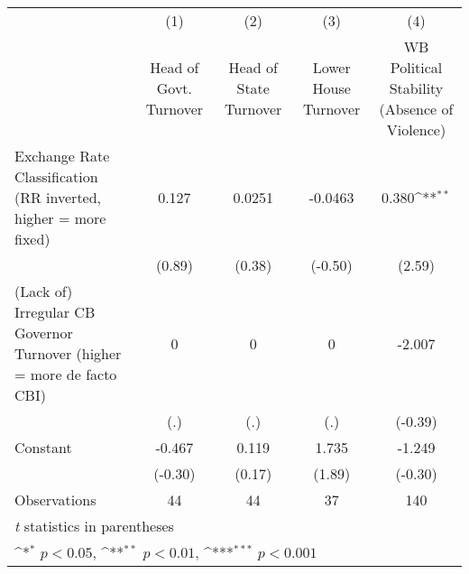{
\def\sym#1{\ifmmode^{#1}\else\(^{#1}\)\fi}
\begin{tabular*}{\linewidth}{@{\hskip\tabcolsep\extracolsep\fill}l*{4}{c}}
\hline\hline
                &\multicolumn{1}{c}{(1)}&\multicolumn{1}{c}{(2)}&\multicolumn{1}{c}{(3)}&\multicolumn{1}{c}{(4)}\\
                &\multicolumn{1}{c}{Head of Govt. Turnover}&\multicolumn{1}{c}{Head of State Turnover}&\multicolumn{1}{c}{Lower House Turnover}&\multicolumn{1}{c}{WB Political Stability (Absence of Violence)}\\
\hline
Exchange Rate Classification (RR inverted, higher = more fixed)&    0.127         &   0.0251         &  -0.0463         &    0.380\sym{**} \\
                &   (0.89)         &   (0.38)         &  (-0.50)         &   (2.59)         \\
[1em]
(Lack of) Irregular CB Governor Turnover (higher = more de facto CBI)&        0         &        0         &        0         &   -2.007         \\
                &      (.)         &      (.)         &      (.)         &  (-0.39)         \\
[1em]
Constant        &   -0.467         &    0.119         &    1.735         &   -1.249         \\
                &  (-0.30)         &   (0.17)         &   (1.89)         &  (-0.30)         \\
\hline
Observations    &       44         &       44         &       37         &      140         \\
\hline\hline
\multicolumn{5}{l}{\footnotesize \textit{t} statistics in parentheses}\\
\multicolumn{5}{l}{\footnotesize \sym{*} \(p<0.05\), \sym{**} \(p<0.01\), \sym{***} \(p<0.001\)}\\
\end{tabular*}
}
